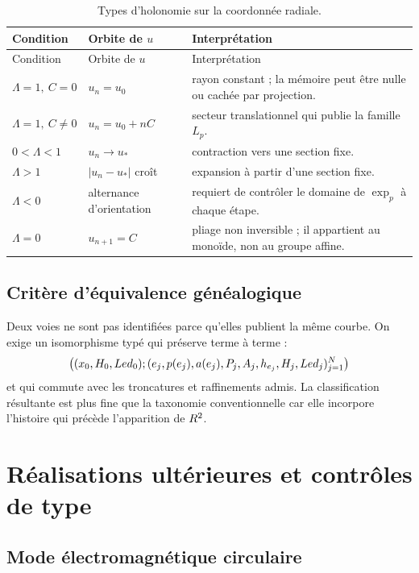 \begin{longtable}{p{}p{}p{}}
\caption{Types d'holonomie sur la coordonnée radiale.}
\label{espiral:tab:tipos-holonomia}\\
\toprule
Condition&Orbite de \(u\)&Interprétation\\
\midrule
\endfirsthead
\toprule
Condition&Orbite de \(u\)&Interprétation\\
\midrule
\endhead
\(\Lambda=1,\ C=0\)&\(u_n=u_0\)&rayon constant ; la mémoire peut être nulle ou cachée par projection.\\
\(\Lambda=1,\ C\neq0\)&\(u_n=u_0+nC\)&secteur translationnel qui publie la famille \(L_p\).\\
\(0<\Lambda<1\)&\(u_n\to u_*\)&contraction vers une section fixe.\\
\(\Lambda>1\)&\(|u_n-u_*|\) croît&expansion à partir d'une section fixe.\\
\(\Lambda<0\)&alternance d'orientation&requiert de contrôler le domaine de \(\exp_p\) à chaque étape.\\
\(\Lambda=0\)&\(u_{n+1}=C\)&pliage non inversible ; il appartient au monoïde, non au groupe affine.\\
\bottomrule
\end{longtable}

\section{Critère d'équivalence généalogique}

Deux voies ne sont pas identifiées parce qu'elles publient la même courbe. On exige un isomorphisme typé qui préserve terme à terme :
\[
 \bigl(
 (x_0,H_0,Led_0);
 (e_j,p(e_j),a(e_j),P_j,A_j,
 h_{e_j},H_j,Led_j)_{j=1}^{N}
 \bigr)
\]
et qui commute avec les troncatures et raffinements admis. La classification résultante est plus fine que la taxonomie conventionnelle car elle incorpore l'histoire qui précède l'apparition de \(R^2\).

\chapter{Réalisations ultérieures et contrôles de type}

\section{Mode électromagnétique circulaire}


